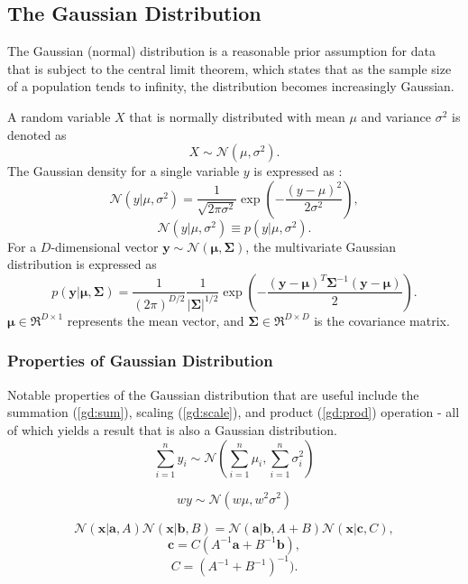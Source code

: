 \documentclass[ %
author={Dillon Keith Diep [INCOMPLETE DRAFT, NOT FOR SUBMISSION]},
supervisor={Dr. Carl Henrik Ek},
degree={MEng},
title={ARt-CG:},
subtitle={Assisted Real-time Content Generation of 3D Hair by Learning Manifolds},
type={Research},
year={2014} ]{dissertation}
\begin{document}
	
	\subsection{The Gaussian Distribution}
	The Gaussian (normal) distribution is a reasonable prior assumption for data that is subject to the central limit theorem, which states that as the sample size of a population tends to infinity, the distribution becomes increasingly Gaussian. \cite{bishop}
	
	A random variable $X$ that is normally distributed with mean $\mu$ and variance $\sigma^2$ is denoted as
	$$X\sim\mathcal{N}(\mu, \sigma^2).$$
	The Gaussian density for a single variable $y$ is expressed as \cite{bishop}:
	$$\mathcal{N}(y|\mu, \sigma^2)=\frac{1}{\sqrt{2\pi\sigma^2}}\exp\left(-\frac{(y-\mu)^2}{2\sigma^2}\right),$$
	$$\mathcal{N}(y|\mu,\sigma^2) \equiv p(y|\mu,\sigma^2).$$
	For a $D$-dimensional vector $\bm{y}\sim\mathcal{N}(\bm{\mu},\bm{\Sigma})$, the multivariate Gaussian distribution is expressed as \cite{gp}
	$$p(\bm{y}|\bm{\mu},\bm{ \Sigma})=\frac{1}{(2\pi)^{D/2}}\frac{1}{|\bm{\Sigma}|^{1/2}}\exp\left(-\frac{(\bm{y}-\bm{\mu})^T\bm{\Sigma}^{-1}(\bm{y}-\bm{\mu})}{2}\right).$$
	$\bm{\mu}\in\Re^{D \times 1}$ represents the mean vector, and $\bm{\Sigma}\in\Re^{D \times D}$ is the covariance matrix.
	
	\subsubsection{Properties of Gaussian Distribution}
	Notable properties of the Gaussian distribution that are useful include the summation (\ref{gd:sum}), scaling (\ref{gd:scale}), and product (\ref{gd:prod}) operation - all of which yields a result that is also a Gaussian distribution. \cite{gp}
	\begin{equation} \label{gd:sum}
	\sum^n_{i=1}y_i\sim\mathcal{N}(\sum^n_{i=1}\mu_i,\sum^n_{i=1}\sigma^2_i)
	\end{equation}
	
	\begin{equation} \label{gd:scale}
	wy\sim\mathcal{N}(w\mu,w^2\sigma^2)
	\end{equation}
	
	\begin{equation} \label{gd:prod}
	\mathcal{N}(\bm{x|a},A)\mathcal{N}(\bm{x|b},B) = \mathcal{N}(\bm{a|b},A+B)\mathcal{N}(\bm{x}|\bm{c}, C),
	\end{equation}
	$$\bm{c}=C(A^{-1}\bm{a}+B^{-1}\bm{b}),$$
	$$C = (A^{-1}+B^{-1})^{-1}).$$
	
\end{document}

